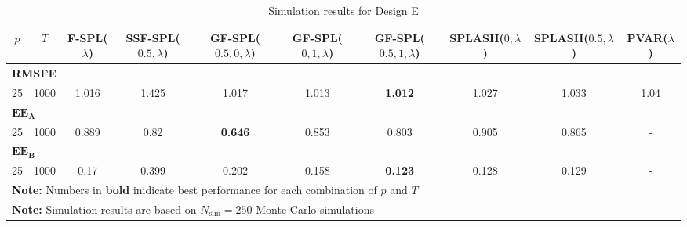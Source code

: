 \begin{landscape}
    \bgroup
    \def\arraystretch{1.3}
    \begin{table}[p]
    \footnotesize
    \centering
    \caption{Simulation results for Design E}
    \label{tab:results_designE}
    \begin{tabular}{cccccccccc}    
    \hline \hline
    $p$  &  $T$   &  F-SPL($\lambda$)  & SSF-SPL($0.5, \lambda$)  &  GF-SPL($0.5, 0, \lambda$)  &  GF-SPL($0, 1, \lambda$)  &  GF-SPL($0.5, 1, \lambda$)  &  SPLASH($0, \lambda$)  &  SPLASH($0.5, \lambda$)  &  PVAR($\lambda$)  \\
    \hline
    \multicolumn{10}{l}{\textbf{RMSFE}} \\
	\hline
	 25  & 1000 &       1.016        &           1.425           &            1.017            &           1.013           & \textbf{1.012}              &         1.027          &          1.033           &       1.04        \\
	\hline
	\multicolumn{10}{l}{$\mathbf{EE_A}$} \\
	\hline
	 25  & 1000 &       0.889        &           0.82            & \textbf{0.646}              &           0.853           &            0.803            &         0.905          &          0.865           & -                 \\
	\hline
	\multicolumn{10}{l}{$\mathbf{EE_B}$} \\
	\hline
	 25  & 1000 &        0.17        &           0.399           &            0.202            &           0.158           & \textbf{0.123}              &         0.128          &          0.129           & -                 \\
	\hline
	\hline
    \multicolumn{10}{l}{\textbf{Note:} Numbers in \textbf{bold} inidicate best performance for each combination of $p$ and $T$} \\
    \multicolumn{10}{l}{\textbf{Note:} Simulation results are based on $N_\text{sim} = 250$ Monte Carlo simulations}
    \end{tabular}
    \end{table}
    \egroup
\end{landscape}
    